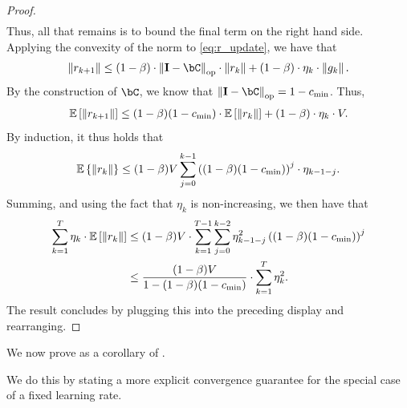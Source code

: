 \begin{proof}
\begin{align}
     \end{align}
     Thus, all that remains is to bound the final term on the right hand side.  Applying the convexity of the norm to \eqref{eq:r_update}, we have that
     \begin{align}
        \norm{r_{k+1}} \leq (1 - \beta) \cdot \normop{\eye - \bC} \cdot \norm{r_k} + (1 - \beta) \cdot \eta_k \cdot \norm{g_k}.
     \end{align} 
     By the construction of $\bC$, we know that $\normop{\eye - \bC} = 1 - \cmin$.  Thus,
     \begin{align}
        \mathbb{E}\left[ \left\|r_{k+1}\right\| \right] \leq (1 - \beta)(1 - c_{\mathrm{min}}) \cdot \mathbb{E}\left[ \left\|r_k\right\| \right] + (1 - \beta) \cdot \eta_k \cdot V.
     \end{align}
     By induction, it thus holds that
     \begin{align}
        \mathbb{E}\left\{ \left\|r_k\right\| \right\} \leq (1 - \beta) V \sum_{j=0}^{k-1} \left( (1 - \beta)(1 - c_{\mathrm{min}}) \right)^j \cdot \eta_{k-1-j}.
     \end{align}
     Summing, and using the fact that $\eta_k$ is non-increasing, we then have that
     \begin{align}
        \sum_{k  = 1}^T \eta_k \cdot \mathbb{E}\left[ \left\|r_k\right\| \right] &\leq (1 - \beta) V \cdot \sum_{k = 1}^{T - 1}  \sum_{j = 0}^{k-2} \eta_{k-1-j}^2\left( (1 - \beta)(1 - c_{\mathrm{min}}) \right)^j \\
        &\leq \frac{(1 - \beta) V}{1 - (1 - \beta)(1 - c_{\mathrm{min}})} \cdot \sum_{k=1}^T \eta_k^2.
     \end{align}
     The result concludes by plugging this into the preceding display and rearranging.
\end{proof}
We now prove  as a corollary of .

We do this by stating a more explicit convergence guarantee for the special case of a fixed learning rate.

